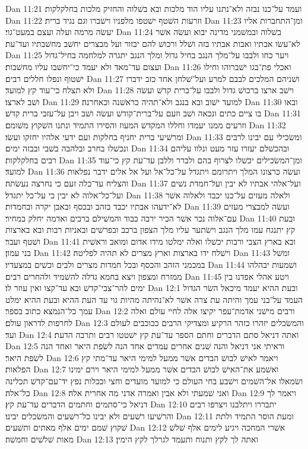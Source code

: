Dan 11:21  ועמד על־כנו נבזה ולא־נתנו עליו הוד מלכות ובא בשׁלוה והחזיק מלכות בחלקלקות׃
Dan 11:22  וזרעות השׁטף ישׁטפו מלפניו וישׁברו וגם נגיד ברית׃
Dan 11:23  ומן־התחברות אליו יעשׂה מרמה ועלה ועצם במעט־גוי׃
Dan 11:24  בשׁלוה ובמשׁמני מדינה יבוא ועשׂה אשׁר לא־עשׂו אבתיו ואבות אבתיו בזה ושׁלל ורכושׁ להם יבזור ועל מבצרים יחשׁב מחשׁבתיו ועד־עת׃
Dan 11:25  ויער כחו ולבבו על־מלך הנגב בחיל גדול ומלך הנגב יתגרה למלחמה בחיל־גדול ועצום עד־מאד ולא יעמד כי־יחשׁבו עליו מחשׁבות׃
Dan 11:26  ואכלי פת־בגו ישׁברוהו וחילו ישׁטוף ונפלו חללים רבים׃
Dan 11:27  ושׁניהם המלכים לבבם למרע ועל־שׁלחן אחד כזב ידברו ולא תצלח כי־עוד קץ למועד׃
Dan 11:28  וישׁב ארצו ברכושׁ גדול ולבבו על־ברית קדשׁ ועשׂה ושׁב לארצו׃
Dan 11:29  למועד ישׁוב ובא בנגב ולא־תהיה כראשׁנה וכאחרנה׃
Dan 11:30  ובאו בו ציים כתים ונכאה ושׁב וזעם על־ברית־קודשׁ ועשׂה ושׁב ויבן על־עזבי ברית קדשׁ׃
Dan 11:31  וזרעים ממנו יעמדו וחללו המקדשׁ המעוז והסירו התמיד ונתנו השׁקוץ משׁומם׃
Dan 11:32  ומרשׁיעי ברית יחניף בחלקות ועם ידעי אלהיו יחזקו ועשׂו׃
Dan 11:33  ומשׂכילי עם יבינו לרבים ונכשׁלו בחרב ובלהבה בשׁבי ובבזה ימים׃
Dan 11:34  ובהכשׁלם יעזרו עזר מעט ונלוו עליהם רבים בחלקלקות׃
Dan 11:35  ומן־המשׂכילים יכשׁלו לצרוף בהם ולברר וללבן עד־עת קץ כי־עוד למועד׃
Dan 11:36  ועשׂה כרצונו המלך ויתרומם ויתגדל על־כל־אל ועל אל אלים ידבר נפלאות והצליח עד־כלה זעם כי נחרצה נעשׂתה׃
Dan 11:37  ועל־אלהי אבתיו לא יבין ועל־חמדת נשׁים ועל־כל־אלוה לא יבין כי על־כל יתגדל׃
Dan 11:38  ולאלה מעזים על־כנו יכבד ולאלוה אשׁר לא־ידעהו אבתיו יכבד בזהב ובכסף ובאבן יקרה ובחמדות׃
Dan 11:39  ועשׂה למבצרי מעזים עם־אלוה נכר אשׁר הכיר ירבה כבוד והמשׁילם ברבים ואדמה יחלק במחיר׃
Dan 11:40  ובעת קץ יתנגח עמו מלך הנגב וישׂתער עליו מלך הצפון ברכב ובפרשׁים ובאניות רבות ובא בארצות ושׁטף ועבר׃
Dan 11:41  ובא בארץ הצבי ורבות יכשׁלו ואלה ימלטו מידו אדום ומואב וראשׁית בני עמון׃
Dan 11:42  וישׁלח ידו בארצות וארץ מצרים לא תהיה לפליטה׃
Dan 11:43  ומשׁל במכמני הזהב והכסף ובכל חמדות מצרים ולבים וכשׁים במצעדיו׃
Dan 11:44  ושׁמעות יבהלהו ממזרח ומצפון ויצא בחמא גדלה להשׁמיד ולהחרים רבים׃
Dan 11:45  ויטע אהלי אפדנו בין ימים להר־צבי־קדשׁ ובא עד־קצו ואין עוזר לו׃
Dan 12:1  ובעת ההיא יעמד מיכאל השׂר הגדול העמד על־בני עמך והיתה עת צרה אשׁר לא־נהיתה מהיות גוי עד העת ההיא ובעת ההיא ימלט עמך כל־הנמצא כתוב בספר׃
Dan 12:2  ורבים מישׁני אדמת־עפר יקיצו אלה לחיי עולם ואלה לחרפות לדראון עולם׃
Dan 12:3  והמשׂכלים יזהרו כזהר הרקיע ומצדיקי הרבים ככוכבים לעולם ועד׃
Dan 12:4  ואתה דניאל סתם הדברים וחתם הספר עד־עת קץ ישׁטטו רבים ותרבה הדעת׃
Dan 12:5  וראיתי אני דניאל והנה שׁנים אחרים עמדים אחד הנה לשׂפת היאר ואחד הנה לשׂפת היאר׃
Dan 12:6  ויאמר לאישׁ לבושׁ הבדים אשׁר ממעל למימי היאר עד־מתי קץ הפלאות׃
Dan 12:7  ואשׁמע את־האישׁ לבושׁ הבדים אשׁר ממעל למימי היאר וירם ימינו ושׂמאלו אל־השׁמים וישׁבע בחי העולם כי למועד מועדים וחצי וככלות נפץ יד־עם־קדשׁ תכלינה כל־אלה׃
Dan 12:8  ואני שׁמעתי ולא אבין ואמרה אדני מה אחרית אלה׃
Dan 12:9  ויאמר לך דניאל כי־סתמים וחתמים הדברים עד־עת קץ׃
Dan 12:10  יתבררו ויתלבנו ויצרפו רבים והרשׁיעו רשׁעים ולא יבינו כל־רשׁעים והמשׂכלים יבינו׃
Dan 12:11  ומעת הוסר התמיד ולתת שׁקוץ שׁמם ימים אלף מאתים ותשׁעים׃
Dan 12:12  אשׁרי המחכה ויגיע לימים אלף שׁלשׁ מאות שׁלשׁים וחמשׁה׃
Dan 12:13  ואתה לך לקץ ותנוח ותעמד לגרלך לקץ הימין׃


